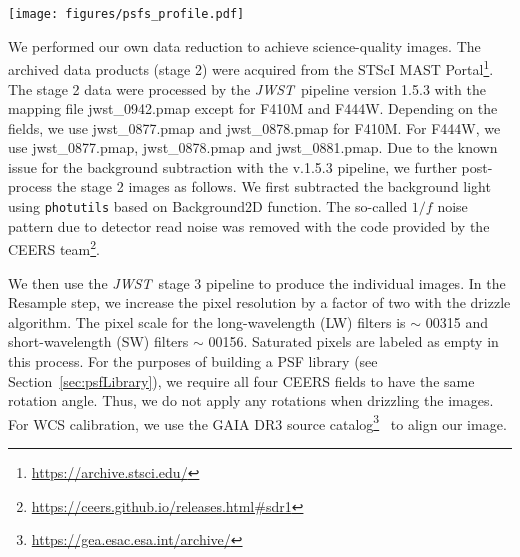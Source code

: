 \documentclass[twocolumn]{aastex631}
\newcommand{\jwst}{{\it JWST}}
\begin{document}
\begin{figure*}
\centering
\texttt{[image: figures/psfs\_profile.pdf]}
\caption{Selected nine PSF surface brightness (SB) profiles (annuli) as a function of radius (based on stars detected by \jwst) per filter are shown selected from our PSF library compared with the simulated PSF model by \texttt{webbpsf}. The vertical lines indicate the FWHM values of the PSF-stars (averaged) and PSF model by \texttt{webbpsf}. We only show the profile's very inner region ($<7$ pixels), which is the key to the AGN subtraction. The PSFs in our library demonstrate a very stable performance, while the simulated PSF models by \jwst\ are too narrow (i.e., peaking at the center) for all the filters.
\label{fig:PSFprofile}}
\end{figure*}

 We performed our own data reduction to achieve science-quality images. The archived data products (stage 2) were acquired from the STScI MAST Portal\footnote{\url{https://archive.stsci.edu/}}. The stage 2 data were processed by the \jwst\ pipeline version 1.5.3 with the mapping file \textsf{jwst\_0942.pmap} except for F410M and F444W. Depending on the fields, we use \textsf{jwst\_0877.pmap} and \textsf{jwst\_0878.pmap} for F410M. For F444W, we use \textsf{jwst\_0877.pmap}, \textsf{jwst\_0878.pmap} and \textsf{jwst\_0881.pmap}. Due to the known issue for the background subtraction with the v.1.5.3 pipeline, we further post-process the stage 2 images as follows. We first subtracted the background light using \texttt{photutils} based on \textsf{Background2D} function. 
 The so-called $1/f$ noise pattern due to detector read noise was removed with the code provided by the CEERS team\footnote{\url{https://ceers.github.io/releases.html\#sdr1}}.

We then use the \jwst\ stage 3 pipeline to produce the individual images. In the  \textsf{Resample} step, we increase the pixel resolution by a factor of two with the drizzle algorithm. The pixel scale for the long-wavelength (LW) filters is $\sim$ 0\farcs{}0315 and short-wavelength (SW) filters $\sim$ 0\farcs{}0156. Saturated pixels are labeled as empty in this process. For the purposes of building a PSF library (see Section~\ref{sec:psfLibrary}), we require all four CEERS fields to have the same rotation angle. Thus, we do not apply any rotations when drizzling the images. For WCS calibration, we use the GAIA DR3 source catalog\footnote{\url{https://gea.esac.esa.int/archive/}}~\citep{GAIA16} to align our image. 
\end{document}
